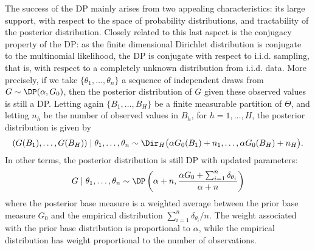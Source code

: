 The success of the DP mainly arises from two appealing characteristics: its large support, with respect to the space of probability distributions, and tractability of the posterior distribution.
Closely related to this last aspect is the conjugacy property of the DP: as the finite dimensional Dirichlet distribution is conjugate to the multinomial likelihood, the DP is conjugate with respect to i.i.d. sampling, that is, with respect to a completely unknown distribution from i.i.d. data.
More precisely, if we take $\{\theta_1,\dots,\theta_n\}$ a sequence of independent draws from $G\sim\DP(\alpha,G_0)$, then the posterior distribution of $G$ given these observed values is still a DP. 
Letting again $\{B_1,\dots,B_H\}$ be a finite measurable partition of $\Theta$, and letting $n_h$ be the number of observed values in $B_h$, for $h = 1,\dots,H$, the posterior distribution is given by
\begin{equation*}
(G(B_1),\dots,G(B_H))\mid \theta_1,\dots,\theta_n \sim \Dir_H\big(\alpha G_0(B_1) + n_1,\dots,\alpha G_0(B_H) + n_H\big).
\end{equation*}
In other terms, the posterior distribution is still DP with updated parameters:
\begin{equation*}
G \mid \theta_1,\dots,\theta_n \sim \DP \left(\alpha + n, \frac{\alpha G_0 + \sum_{i=1}^n \delta_{\theta_i}}{\alpha + n} \right)
\end{equation*}
where the posterior base measure is a weighted average between the prior base measure $G_0$ and the empirical distribution $\sum_{i=1}^n \delta_{\theta_i} / n$.
The weight associated with the prior base distribution is proportional to $\alpha$, while the empirical distribution has weight proportional to the number of observations.


